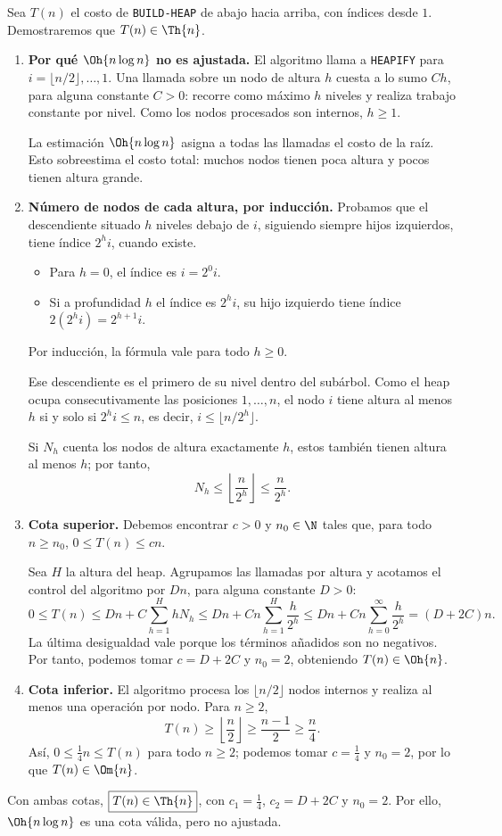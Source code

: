 
Sea $T(n)$ el costo de \texttt{BUILD-HEAP} de abajo hacia arriba, con índices desde $1$. Demostraremos que $T(n)\in\Th{n}$.

\begin{enumerate}
\item \textbf{Por qué $\Oh{n\log n}$ no es ajustada.}
El algoritmo llama a \texttt{HEAPIFY} para $i=\lfloor n/2\rfloor,\ldots,1$. Una llamada sobre un nodo de altura $h$ cuesta a lo sumo $Ch$, para alguna constante $C>0$: recorre como máximo $h$ niveles y realiza trabajo constante por nivel. Como los nodos procesados son internos, $h\ge1$.

La estimación $\Oh{n\log n}$ asigna a todas las llamadas el costo de la raíz. Esto sobreestima el costo total: muchos nodos tienen poca altura y pocos tienen altura grande.

\item \textbf{Número de nodos de cada altura, por inducción.}
Probamos que el descendiente situado $h$ niveles debajo de $i$, siguiendo siempre hijos izquierdos, tiene índice $2^hi$, cuando existe.
\begin{itemize}
\item Para $h=0$, el índice es $i=2^0i$.
\item Si a profundidad $h$ el índice es $2^hi$, su hijo izquierdo tiene índice $2(2^hi)=2^{h+1}i$.
\end{itemize}
Por inducción, la fórmula vale para todo $h\ge0$.

Ese descendiente es el primero de su nivel dentro del subárbol. Como el heap ocupa consecutivamente las posiciones $1,\ldots,n$, el nodo $i$ tiene altura al menos $h$ si y solo si $2^hi\le n$, es decir, $i\le\lfloor n/2^h\rfloor$.

Si $N_h$ cuenta los nodos de altura exactamente $h$, estos también tienen altura al menos $h$; por tanto,
\[
N_h\le\left\lfloor\frac{n}{2^h}\right\rfloor\le\frac{n}{2^h}.
\]

\item \textbf{Cota superior.}
Debemos encontrar $c>0$ y $n_0\in\N$ tales que, para todo $n\ge n_0$, $0\le T(n)\le cn$.

Sea $H$ la altura del heap. Agrupamos las llamadas por altura y acotamos el control del algoritmo por $Dn$, para alguna constante $D>0$:
\[
0\le T(n)
\le Dn+C\sum_{h=1}^{H}hN_h
\le Dn+Cn\sum_{h=1}^{H}\frac{h}{2^h}
\le Dn+Cn\sum_{h=0}^{\infty}\frac{h}{2^h}
=(D+2C)n.
\]
La última desigualdad vale porque los términos añadidos son no negativos. Por tanto, podemos tomar $c=D+2C$ y $n_0=2$, obteniendo $T(n)\in\Oh{n}$.

\item \textbf{Cota inferior.}
El algoritmo procesa los $\lfloor n/2\rfloor$ nodos internos y realiza al menos una operación por nodo. Para $n\ge2$,
\[
T(n)\ge\left\lfloor\frac n2\right\rfloor
\ge\frac{n-1}{2}\ge\frac n4.
\]
Así, $0\le \frac14n\le T(n)$ para todo $n\ge2$; podemos tomar $c=\frac14$ y $n_0=2$, por lo que $T(n)\in\Om{n}$.
\end{enumerate}

Con ambas cotas, $\boxed{T(n)\in\Th{n}}$, con $c_1=\frac14$, $c_2=D+2C$ y $n_0=2$. Por ello, $\Oh{n\log n}$ es una cota válida, pero no ajustada.
\fin
